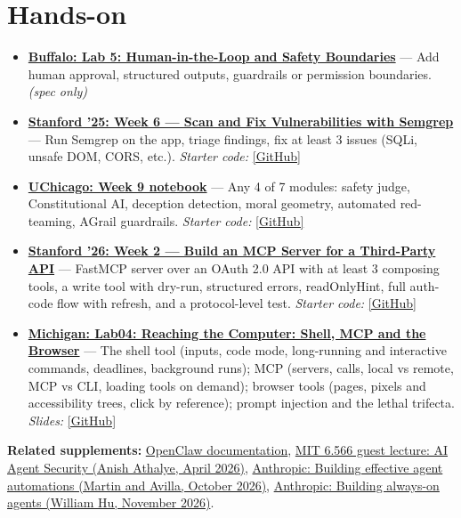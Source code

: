 \documentclass[10pt,oneside]{report}
\begin{document}
\section{Hands-on}
\begin{itemize}
\item \hyperlink{asg-UB-5}{\textbf{Buffalo: Lab 5: Human-in-the-Loop and Safety Boundaries}} --- Add human approval, structured outputs, guardrails or permission boundaries. \textit{(spec only)}
\item \hyperlink{asg-STAN25-6}{\textbf{Stanford '25: Week 6 --- Scan and Fix Vulnerabilities with Semgrep}} --- Run Semgrep on the app, triage findings, fix at least 3 issues (SQLi, unsafe DOM, CORS, etc.). \textit{Starter code:} \href{https://github.com/mihail911/modern-software-dev-assignments/tree/fall2025/week6}{[GitHub]}
\item \hyperlink{asg-UCHI-9}{\textbf{UChicago: Week 9 notebook}} --- Any 4 of 7 modules: safety judge, Constitutional AI, deception detection, moral geometry, automated red-teaming, AGrail guardrails. \textit{Starter code:} \href{https://github.com/KnowledgeLab/AI-Agents-for-Social-Science-and-Society-2026/blob/main/Tutorials-Homework_Notebooks/Week_9.ipynb}{[GitHub]}
\item \hyperlink{asg-STAN26-2}{\textbf{Stanford '26: Week 2 --- Build an MCP Server for a Third-Party API}} --- FastMCP server over an OAuth 2.0 API with at least 3 composing tools, a write tool with dry-run, structured errors, readOnlyHint, full auth-code flow with refresh, and a protocol-level test. \textit{Starter code:} \href{https://github.com/mihail911/modern-software-dev-assignments/blob/master/week2/assignment.md}{[GitHub]}
\item \hyperlink{asg-UMICH-11}{\textbf{Michigan: Lab04: Reaching the Computer: Shell, MCP and the Browser}} --- The shell tool (inputs, code mode, long-running and interactive commands, deadlines, background runs); MCP (servers, calls, local vs remote, MCP vs CLI, loading tools on demand); browser tools (pages, pixels and accessibility trees, click by reference); prompt injection and the lethal trifecta. \textit{Slides:} \href{https://github.com/eecs498-aase/materials/blob/main/labs/Lab04/slides.pdf}{[GitHub]}
\end{itemize}
\textbf{Related supplements:} \hyperref[sup-openclaw]{OpenClaw documentation}, \hyperref[sup-agentsec]{MIT 6.566 guest lecture: AI Agent Security (Anish Athalye, April 2026)}, \hyperref[sup-anthauto]{Anthropic: Building effective agent automations (Martin and Avilla, October 2026)}, \hyperref[sup-alwayson]{Anthropic: Building always-on agents (William Hu, November 2026)}.
\end{document}

